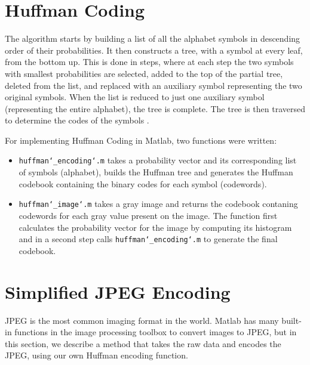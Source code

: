 \documentclass[11pt,a4paper,table]{article}
\begin{document}
\section{Huffman Coding}
The algorithm starts by building a list of all the alphabet symbols in descending order of their probabilities. It then constructs a tree, with a symbol at every leaf, from the bottom up. This is done in steps, where at each step the two symbols with smallest probabilities are selected, added to the top of the partial tree, deleted from the list, and replaced with an auxiliary symbol representing the two original symbols. When the list is reduced to just one auxiliary symbol (representing the entire alphabet), the tree is complete. The tree is then traversed to determine the codes of the symbols  \cite{Salomon2007}.

For implementing Huffman Coding in Matlab, two functions were written: 
\begin{itemize}
\item \texttt{huffman\char`_encoding\char`.m} takes a probability vector and its corresponding list of symbols (alphabet), builds the Huffman tree and generates the Huffman codebook containing the binary codes for each symbol (codewords).
\item \texttt{huffman\char`_image\char`.m}  takes a gray image and returns the codebook contaning codewords for each gray value present on the image. The function first calculates the probability vector for the image by computing its histogram and in a second step calls \texttt{huffman\char`_encoding\char`.m} to generate the final codebook. 
\end{itemize}

\section{Simplified JPEG Encoding}
JPEG is the most common imaging format in the world. Matlab has many built-in functions in the image processing toolbox to convert images to JPEG, but in this section, we describe a method that takes the raw data and encodes the JPEG, using our own Huffman encoding function.
\end{document}
